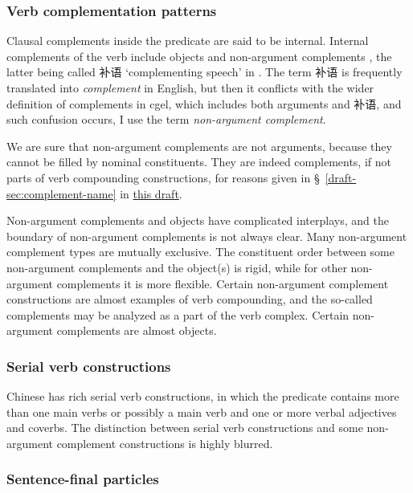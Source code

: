 \documentclass[UTF8, a4paper, oneside, scheme=plain]{ctexart}
\newcommand*{\citesec}[1]{\S~{#1}}
\newcommand*{\term}[1]{\emph{#1}}
\newcommand{\draft}{\href{./main.pdf}{this draft}}
\newcommand{\translate}[1]{`#1'}
\begin{document}
\subsubsection{Verb complementation patterns}

Clausal complements inside the predicate are said to be internal.
Internal complements of the verb include objects and non-argument complements
\citep[1.3.3-1.3.4]{zhudexigrammar},
the latter being called 补语 \translate{complementing speech} in \citet{zhudexigrammar}.
The term 补语 is frequently translated into \term{complement} in English,
but then it conflicts with the wider definition of complements in \ac{cgel},
which includes both arguments and 补语,
and such confusion occurs,
I use the term \term{non-argument complement}.

We are sure that non-argument complements are not arguments,
because they cannot be filled by nominal constituents.
They are indeed complements, if not parts of verb compounding constructions,
for reasons given in \citesec{\ref{draft-sec:complement-name}} in \draft.

Non-argument complements and objects have complicated interplays,
and the boundary of non-argument complements is not always clear.
Many non-argument complement types are mutually exclusive.
The constituent order between some non-argument complements and the object(s) is rigid,
while for other non-argument complements it is more flexible.
Certain non-argument complement constructions are almost examples of verb compounding,
and the so-called complements may be analyzed as a part of the verb complex.
Certain non-argument complements are almost objects.

\subsubsection{Serial verb constructions}\label{sec:serial-verb-construction-intro}

Chinese has rich serial verb constructions,
in which the predicate contains more than one main verbs
or possibly a main verb and one or more verbal adjectives and coverbs.
The distinction between serial verb constructions and some non-argument complement constructions 
is highly blurred.

\subsubsection{Sentence-final particles}
\end{document}
